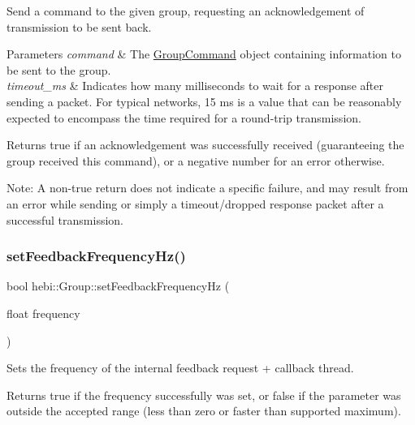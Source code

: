 Send a command to the given group, requesting an acknowledgement of transmission to be sent back. 


\begin{DoxyParams}{Parameters}
{\em command} & The \hyperlink{classhebi_1_1GroupCommand}{Group\+Command} object containing information to be sent to the group. \\
\hline
{\em timeout\+\_\+ms} & Indicates how many milliseconds to wait for a response after sending a packet. For typical networks, \textquotesingle{}15\textquotesingle{} ms is a value that can be reasonably expected to encompass the time required for a round-\/trip transmission.\\
\hline
\end{DoxyParams}
\begin{DoxyReturn}{Returns}
true if an acknowledgement was successfully received (guaranteeing the group received this command), or a negative number for an error otherwise.
\end{DoxyReturn}
Note\+: A non-\/true return does not indicate a specific failure, and may result from an error while sending or simply a timeout/dropped response packet after a successful transmission. \mbox{\label{classhebi_1_1Group_a4c2dce41b42dc0d318e220098c4d05e4}} 
\subsubsection{\texorpdfstring{set\+Feedback\+Frequency\+Hz()}{setFeedbackFrequencyHz()}}
{\footnotesize\ttfamily bool hebi\+::\+Group\+::set\+Feedback\+Frequency\+Hz (\begin{DoxyParamCaption}\item[{float}]{frequency }\end{DoxyParamCaption})}



Sets the frequency of the internal feedback request + callback thread. 

\begin{DoxyReturn}{Returns}
{\ttfamily true} if the frequency successfully was set, or {\ttfamily false} if the parameter was outside the accepted range (less than zero or faster than supported maximum). 
\end{DoxyReturn}
\mbox{\label{classhebi_1_1Group_ac3760e72c22a47f365e8c23d9a6dcfb7}} 
